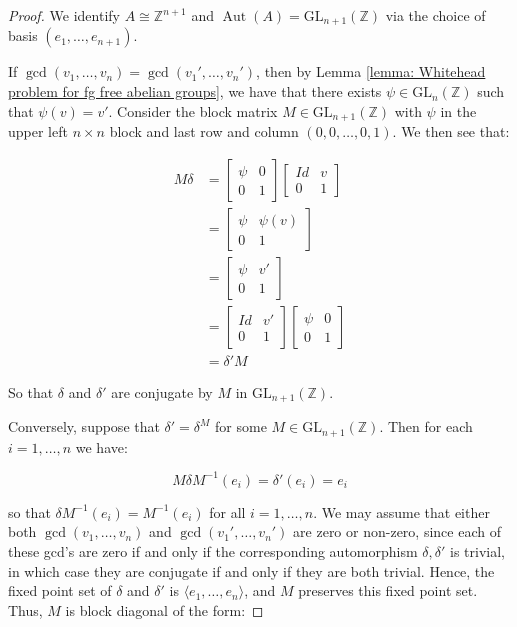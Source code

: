 \documentclass{amsart}
\newcommand{\Z}{\mathbb{Z}}
\DeclareMathOperator{\Aut}{Aut}
\theoremstyle{plain}
\theoremstyle{definition}
\theoremstyle{remark}
\begin{document}
\begin{proof}

    We identify $A \cong \Z^{n+1}$ and $\Aut(A) = \mathrm{GL}_{n+1}(\Z)$ via the choice of basis $(e_1,\ldots,e_{n+1})$. 

    If $\gcd(v_1,\ldots,v_n) = \gcd(v_1',\ldots,v_n')$, then by Lemma \ref{lemma: Whitehead problem for fg free abelian groups}, we have that there exists $\psi \in \mathrm{GL}_n(\Z)$ such that $\psi(v) = v'$. Consider the block matrix $M \in \mathrm{GL}_{n+1}(\Z)$ with $\psi$ in the upper left $n \times n$ block and last row and column $(0,0,\ldots,0,1)$. We then see that: 

    \begin{align*}
        M \delta &= \begin{bmatrix}
        \psi & 0 \\
        0 & 1
    \end{bmatrix} \begin{bmatrix}
        Id & v \\
        0 & 1
    \end{bmatrix} \\
    &= \begin{bmatrix}
        \psi & \psi(v) \\
        0 & 1
    \end{bmatrix} \\
    &= \begin{bmatrix}
        \psi & v' \\
        0 & 1
    \end{bmatrix} \\
    &= \begin{bmatrix}
        Id & v' \\
        0 & 1
    \end{bmatrix} \begin{bmatrix}
        \psi & 0 \\
        0 & 1
    \end{bmatrix} \\
    &= \delta' M
    \end{align*}

    So that $\delta$ and $\delta'$ are conjugate by $M$ in $\mathrm{GL}_{n+1}(\Z)$.

    Conversely, suppose that $\delta' = \delta^M$ for some $M \in \mathrm{GL}_{n+1}(\Z)$. Then for each $i=1,\ldots,n$ we have: 

    $$M \delta M^{-1}(e_i) = \delta'(e_i) = e_i$$

    so that $\delta M^{-1}(e_i) = M^{-1}(e_i)$ for all $i=1,\ldots,n$. We may assume that either both $\gcd(v_1,\ldots,v_n)$ and $ \gcd(v_1',\ldots,v_n')$ are zero or non-zero, since each of these gcd's are zero if and only if the corresponding automorphism $\delta, \delta'$ is trivial, in which case they are conjugate if and only if they are both trivial. Hence, the fixed point set of $\delta$ and $\delta'$ is $\langle e_1, \ldots, e_n \rangle$, and $M$ preserves this fixed point set. Thus, $M$ is block diagonal of the form: 


\end{proof}
\end{document}
